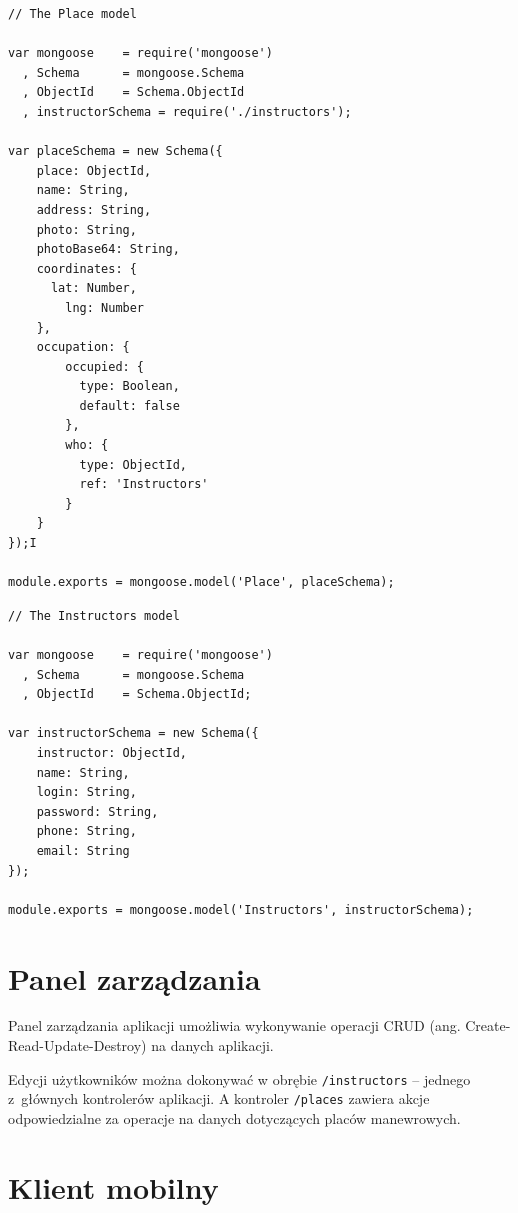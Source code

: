 \documentclass[twoside,a4paper,openright,12pt]{book}
\begin{document}
\begin{lstlisting}[frame=single,label={lst:model placów},caption=Schemat danych placów manewrowych -- plik: /models/places.js]
// The Place model

var mongoose 	= require('mongoose')
  ,	Schema 		= mongoose.Schema
  ,	ObjectId 	= Schema.ObjectId
  , instructorSchema = require('./instructors');

var placeSchema = new Schema({
    place: ObjectId,
    name: String,
    address: String,
    photo: String,
    photoBase64: String,
    coordinates: {
      lat: Number,
     	lng: Number
    },
    occupation: {
        occupied: { 
          type: Boolean,
          default: false 
        },
        who: { 
          type: ObjectId,
          ref: 'Instructors'
        }
    }
});I

module.exports = mongoose.model('Place', placeSchema);
\end{lstlisting}


\begin{lstlisting}[frame=single,label={lst:model instruktorów},caption=Schemat danych instruktorów -- plik: /models/instructors.js]
// The Instructors model

var mongoose 	= require('mongoose')
  ,	Schema 		= mongoose.Schema
  ,	ObjectId 	= Schema.ObjectId;

var instructorSchema = new Schema({
    instructor: ObjectId,
    name: String,
    login: String,
    password: String,
    phone: String,  
    email: String
});

module.exports = mongoose.model('Instructors', instructorSchema);
\end{lstlisting}


\section{Panel zarządzania}

Panel zarządzania aplikacji umożliwia wykonywanie operacji CRUD (ang. Create-Read-Update-Destroy) na danych aplikacji.

Edycji użytkowników można dokonywać w obrębie \texttt{/instructors} -- jednego z~głównych kontrolerów aplikacji. A kontroler \texttt{/places} zawiera akcje odpowiedzialne za operacje na danych dotyczących placów manewrowych.


\section{Klient mobilny}
\end{document}
